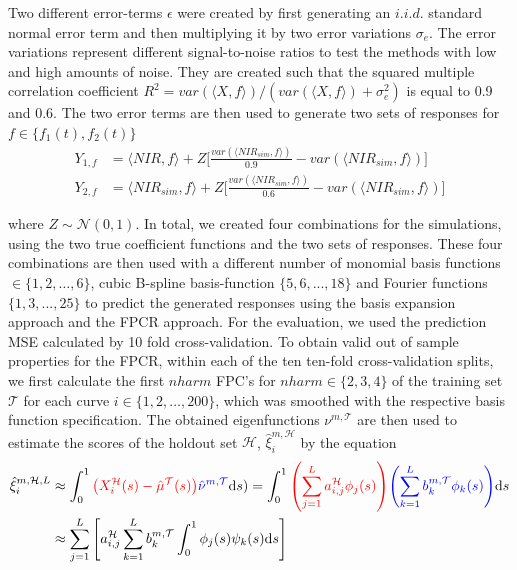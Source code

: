 \documentclass[11pt,twoside,a4paper]{article}
\begin{document}
		 Two different error-terms $\epsilon$ were created by first generating an $i.i.d.$ standard normal error term and then multiplying it by two error variations $\sigma_e $. The error variations represent different signal-to-noise ratios to test the methods with low and high amounts of noise. They are created such that the squared multiple correlation coefficient $R^2 = var(\langle X, f\rangle) / (var(\langle X, f\rangle) + \sigma^2_{e})$ is equal to 0.9 and 0.6. The two error terms are then used to generate two sets of responses for $f \in \{f_1(t), f_2(t)\}$	
		\begin{equation}
			\begin{split}
				Y_{1,f} & = \langle NIR, f\rangle + Z  \biggl\lbrack\frac{var(\langle NIR_{sim}, f\rangle)}{0.9} - var(\langle NIR_{sim}, f\rangle)\biggr\rbrack \\
				Y_{2,f} & = \langle NIR_{sim}, f\rangle + Z  \biggl\lbrack\frac{var(\langle NIR_{sim}, f\rangle)}{0.6} - var(\langle NIR_{sim}, f\rangle)\biggr\rbrack
			\end{split}
		\end{equation}
		
		where $Z \sim \mathcal{N}(0,1)$. In total, we created four combinations for the simulations, using the two true coefficient functions and the two sets of responses. These four combinations are then used with a different number of monomial basis functions $ \in \{1,2, \dots, 6\}$, cubic B-spline basis-function $\{5,6,...,18\}$ and Fourier functions $\{1,3,...,25\}$ to predict the generated responses using the basis expansion approach and the FPCR approach. For the evaluation, we used the prediction MSE calculated by 10 fold cross-validation.
		To obtain valid out of sample properties for the FPCR, within each of the ten ten-fold cross-validation splits, we first calculate the first $nharm$ FPC's for $nharm \in \{2,3,4\}$ of the training set $\mathcal{T}$ for each curve $i \in \{1,2, \dots, 200\}$, which was smoothed with the respective basis function specification. The obtained eigenfunctions $\nu^{m,\mathcal{T}}$ are then used to estimate the scores of the holdout set $\mathcal{H}$, $\hat{\xi}_{i}^{m, \mathcal{H}}$  by the equation
		\begin{equation}
			\begin{split}
				\hat{\xi}_{i}^{m, \mathcal{H},L} &\approx  \int_{0}^{1} {\color{red} \left(X_{i}^{\mathcal{H}}(s) - \hat{\mu}^{\mathcal{T}}(s)\right)} {\color{blue}\hat{\nu}^{m, \mathcal{T}} }\mathrm{d}s) 
			    = \int_{0}^{1} {\color{red}\left(\sum_{j = 1}^{L} a_{i,j}^{\mathcal{H}} \phi_j(s)\right)} {\color{blue}\left(\sum_{k = 1}^{L} b_{k}^{m, \mathcal{T}} \phi_{k}(s)\right)} \mathrm{d}s \\
				 &\approx \sum_{j = 1}^{L} \left[ a_{i,j}^{\mathcal{H}}\sum_{k = 1}^{L}  b_{k}^{m, \mathcal{T}} \int_{0}^{1} \phi_j(s) \psi_{k}(s)\mathrm{d}s\right]
			\end{split}
		\end{equation}
	
\end{document}
